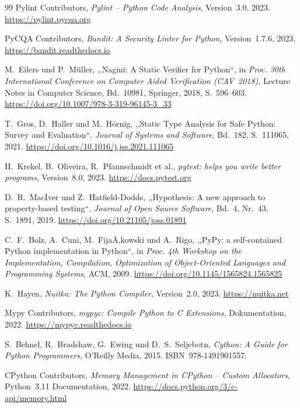 ﻿\documentclass[12pt,a4paper,twoside]{article}
\newcommand{\doi}[1]{\url{https://doi.org/#1}}
\begin{document}
\begin{thebibliography}{99}
  {Pylint Contributors},
  \textit{Pylint -- Python Code Analysis},
  Version~3.0, 2023.
  \url{https://pylint.pycqa.org}

  {PyCQA Contributors},
  \textit{Bandit: A Security Linter for Python},
  Version~1.7.6, 2023.
  \url{https://bandit.readthedocs.io}

  M.~Eilers und P.~Müller,
  ,,Nagini: A Static Verifier for Python``,
  in \textit{Proc. 30th International Conference on Computer Aided
  Verification (CAV~2018)},
  Lecture Notes in Computer Science, Bd.~10981,
  Springer, 2018, S.~596--603.
  \doi{10.1007/978-3-319-96145-3\_33}

  T.~Gros, D.~Haller und M.~Hörnig,
  ,,Static Type Analysis for Safe Python: Survey and Evaluation``,
  \textit{Journal of Systems and Software},
  Bd.~182, S.~111065, 2021.
  \doi{10.1016/j.jss.2021.111065}

  H.~Krekel, B.~Oliveira, R.~Pfannschmidt et al.,
  \textit{pytest: helps you write better programs},
  Version~8.0, 2023.
  \url{https://docs.pytest.org}

  D.~R.~MacIver und Z.~Hatfield-Dodds,
  ,,Hypothesis: A new approach to property-based testing``,
  \textit{Journal of Open Source Software},
  Bd.~4, Nr.~43, S.~1891, 2019.
  \doi{10.21105/joss.01891}

  C.~F.~Bolz, A.~Cuni, M.~FijaÅ‚kowski und A.~Rigo,
  ,,PyPy: a self-contained Python implementation in Python``,
  in \textit{Proc. 4th Workshop on the Implementation, Compilation,
  Optimization of Object-Oriented Languages and Programming Systems},
  ACM, 2009.
  \doi{10.1145/1565824.1565825}

  K.~Hayen,
  \textit{Nuitka: The Python Compiler},
  Version~2.0, 2023.
  \url{https://nuitka.net}

  {Mypy Contributors},
  \textit{mypyc: Compile Python to C Extensions},
  Dokumentation, 2022.
  \url{https://mypyc.readthedocs.io}

  S.~Behnel, R.~Bradshaw, G.~Ewing und D.~S.~Seljebotn,
  \textit{Cython: A Guide for Python Programmers},
  O'Reilly Media, 2015.
  ISBN~978-1491901557.

  {CPython Contributors},
  \textit{Memory Management in CPython -- Custom Allocators},
  Python~3.11 Documentation, 2022.
  \url{https://docs.python.org/3/c-api/memory.html}


\end{thebibliography}
\end{document}
